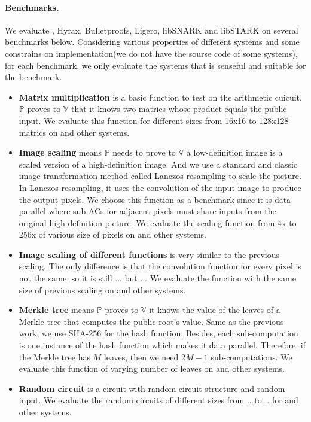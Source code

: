 \paragraph{Benchmarks.} We evaluate \name{}, Hyrax, Bulletproofs, Ligero, libSNARK and libSTARK on several benchmarks below. Considering various properties of different systems and some constrains on implementation(\ie we do not have the sourse code of some systems), for each benchmark, we only evaluate the systems that is senseful and suitable for the benchmark.\\
\begin{itemize}
	\item
	\textbf{Matrix multiplication} is a basic function to test on the arithmetic cuicuit. $\mathbb{P}$ proves to $\mathbb{V}$ that it knows two matrics whose product equals the public input. We evaluate this function for different sizes from 16x16 to 128x128 matrics on \name and other systems.  
	\item
	\textbf{Image scaling} means $\mathbb{P}$ needs to prove to $\mathbb{V}$ a low-definition image is a scaled version of a high-definition image. And we use a standard and classic image transformation method called Lanczos resampling\cite{Lanczos} to scale the picture. In Lanczos resampling, it uses the convolution of the input image to produce the output pixels. We choose this function as a benchmark since it is data parallel where sub-ACs for adjacent pixels must share inputs from the original high-definition picture. We evaluate the scaling function from 4x to 256x of various size of pixels on \name and other systems.
	\item
	\textbf{Image scaling of different functions} is very similar to the previous scaling. The only difference is that the convolution function for every pixel is not the same, so it is still ... but ... We evaluate the function with the same size of previous scaling on \name and other systems.
	\item
	\textbf{Merkle tree} means $\mathbb{P}$ proves to $\mathbb{V}$ it knows the value of the leaves of a Merkle tree\cite{merkletree} that computes the public root's value\cite{blum1994checking}. Same as the previous work, we use SHA-256 for the hash function. Besides, each sub-computation is one instance of the hash function which makes it data parallel. Therefore, if the Merkle tree has $M$ leaves, then we need $2M - 1$ sub-computations. We evaluate this function of varying number of leaves on \name and other systems.
	\item
	\textbf{Random circuit} is a circuit with random circuit structure and random input. We evaluate the random circuits of different sizes from .. to .. for \name and other systems.
\end{itemize}
